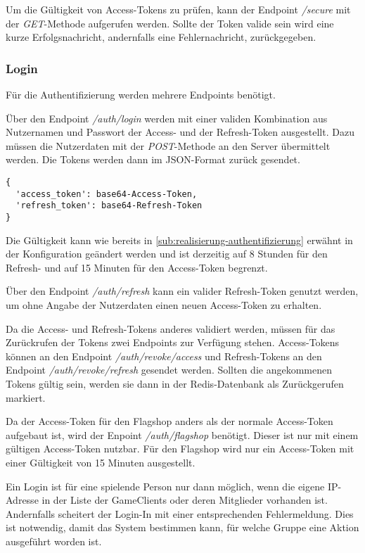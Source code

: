 Um die Gültigkeit von Access-Tokens zu prüfen, kann der Endpoint \textit{/secure} mit der \textit{GET}-Methode aufgerufen werden. Sollte der Token valide sein wird eine kurze Erfolgsnachricht, andernfalls eine Fehlernachricht, zurückgegeben.

\subsubsection{Login}
Für die Authentifizierung werden mehrere Endpoints benötigt.

Über den Endpoint \textit{/auth/login} werden mit einer validen Kombination aus Nutzernamen und Passwort der Access- und der Refresh-Token ausgestellt. Dazu müssen die Nutzerdaten mit der \textit{POST}-Methode an den Server übermittelt werden. Die Tokens werden dann im JSON-Format zurück gesendet.

\begin{lstlisting}[frame=single, caption={GIS Access- und Refresh-Token}, captionpos=b, label={lst:gis-login-tokens}]
{
  'access_token': base64-Access-Token,
  'refresh_token': base64-Refresh-Token
}

\end{lstlisting}

Die Gültigkeit kann wie bereits in \autoref{sub:realisierung-authentifizierung} erwähnt in der Konfiguration geändert werden und ist derzeitig auf 8 Stunden für den Refresh- und auf 15 Minuten für den Access-Token begrenzt.

Über den Endpoint \textit{/auth/refresh} kann ein valider Refresh-Token genutzt werden, um ohne Angabe der Nutzerdaten einen neuen Access-Token zu erhalten.

Da die Access- und Refresh-Tokens anderes validiert werden, müssen für das Zurückrufen der Tokens zwei Endpoints zur Verfügung stehen. Access-Tokens können an den Endpoint \textit{/auth/revoke/access} und Refresh-Tokens an den Endpoint \textit{/auth/revoke/refresh} gesendet werden. Sollten die angekommenen Tokens gültig sein, werden sie dann in der Redis-Datenbank als Zurückgerufen markiert.

Da der Access-Token für den Flagshop anders als der normale Access-Token aufgebaut ist, wird der Enpoint \textit{/auth/flagshop} benötigt. Dieser ist nur mit einem gültigen  Access-Token nutzbar. Für den Flagshop wird nur ein Access-Token mit einer Gültigkeit von 15 Minuten ausgestellt.

Ein Login ist für eine spielende Person nur dann möglich, wenn die eigene IP-Adresse in der Liste der GameClients oder deren Mitglieder vorhanden ist. Andernfalls scheitert der Login-In mit einer entsprechenden Fehlermeldung. Dies ist notwendig, damit das System bestimmen kann, für welche Gruppe eine Aktion ausgeführt worden ist.

